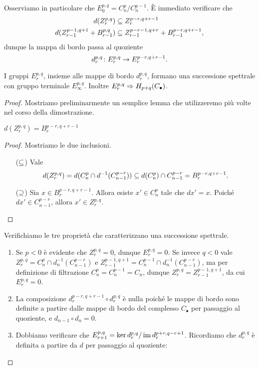 Osserviamo in particolare che $E^{p,q}_0=C^p_n/C^{p-1}_n$. È immediato verificare che
\begin{align*}
d(Z^{p,q}_r)&\subseteq Z^{p-r,q+r-1}_r\\
d(Z^{p-1,q+1}_{r-1}+B^{p,q}_{r-1})&\subseteq Z^{p-r-1,q+r}_{r-1}+B^{p-r,q+r-1}_{r-1},
\end{align*}
dunque la mappa di bordo passa al quoziente
$$
d^{p,q}_r\colon E^{p,q}_r\to E^{p-r,q+r-1}_r.
$$
\begin{proposition}
I gruppi $E^{p,q}_r$, insieme alle mappe di bordo $d^{p,q}_r$, formano una successione spettrale con gruppo terminale $E^{p,q}_\infty$. Inoltre $E^{p,q}_r\Rightarrow H_{p+q}(C_\bullet)$.
\end{proposition}
\begin{proof}
Mostriamo preliminarmente un semplice lemma che utilizzeremo più volte nel corso della dimostrazione.
\begin{lemma*}
$d(Z^{p,q}_r)=B^{p-r,q+r-1}_r$
\end{lemma*}
\begin{proof}
Mostriamo le due inclusioni.
\begin{itemize}
\item[($\subseteq$)] Vale
$$
d(Z^{p,q}_r)=d(C^p_n\cap d^{-1}(C^{p-r}_{n-1}))\subseteq d(C^p_n)\cap C^{p-r}_{n-1}=B^{p-r,q+r-1}_r.
$$
\item[($\supseteq$)] Sia $x\in B^{p-r,q+r-1}_r$. Allora esiste $x'\in C^p_n$ tale che $dx'=x$. Poiché $dx'\in C^{p-r}_{n-1}$, allora $x'\in Z^{p,q}_r$.
\end{itemize}
\end{proof}
Verifichiamo le tre proprietà che caratterizzano una successione spettrale.
\begin{enumerate}
\item Se $p<0$ è evidente che $Z^{p,q}_r=0$, dunque $E^{p,q}_r=0$. Se invece $q<0$ vale $Z^{p,q}_r=C^p_n\cap d_n^{-1}(C^{p-r}_{n-1})$ e $Z^{p-1,q+1}_{r-1}=C^{p-1}_n\cap d_n^{-1}(C^{p-r}_{n-1})$, ma per definizione di filtrazione $C^p_n=C^{p-1}_n=C_n$, dunque $Z^{p,q}_r=Z^{p-1,q+1}_{r-1}$, da cui $E^{p,q}_r=0$.
\item La composizione $d^{p-r,q+r-1}_r\circ d^{p,q}_r$ è nulla poiché le mappe di bordo sono definite a partire dalle mappe di bordo del complesso $C_\bullet$ per passaggio al quoziente, e $d_{n-1}\circ d_n=0$.
\item Dobbiamo verificare che $E^{p,q}_{r+1}=\ker d^{p,q}_r/\operatorname{im} d^{p+r,q-r+1}_r$. Ricordiamo che $d^{p,q}_r$ è definita a partire da $d$ per passaggio al quoziente:

\end{enumerate}
\end{proof}
